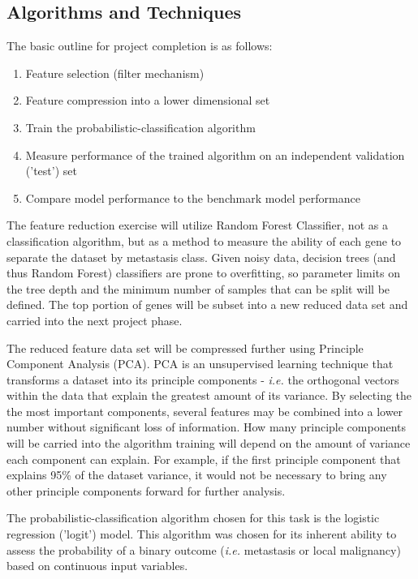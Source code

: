 \documentclass[final]{article}
\begin{document}
\subsection{Algorithms and Techniques}

The basic outline for project completion is as follows:
\begin{enumerate}
\item Feature selection (filter mechanism)
\item Feature compression into a lower dimensional set
\item Train the probabilistic-classification algorithm
\item Measure performance of the trained algorithm on an independent validation ('test') set
\item Compare model performance to the benchmark model performance
\end{enumerate}

The feature reduction exercise will utilize Random Forest Classifier, not as a
classification algorithm, but as a method to measure the ability of each gene to
separate the dataset by metastasis class.  Given noisy data, decision trees (and
thus Random Forest) classifiers are prone to overfitting, so parameter limits on
the tree depth and the minimum number of samples that can be split will be defined.
The top portion of genes will be subset into a new reduced data set and carried
into the next project phase.

The reduced feature data set will be compressed further using Principle Component
Analysis (PCA).  PCA is an unsupervised learning technique that transforms a
dataset into its principle components - \textit{i.e.} the orthogonal vectors within the
data that explain the greatest amount of its variance.  By selecting the
the most important components, several features may be combined into a lower
number without significant loss of information.  How many principle components
will be carried into the algorithm training will depend on the amount of variance
each component can explain.  For example, if the first principle component that
explains 95\% of the dataset variance, it would not be necessary to bring any other
principle components forward for further analysis.

The probabilistic-classification algorithm chosen for this task is the logistic
regression ('logit') model.  This algorithm was chosen for its inherent ability
to assess the probability of a binary outcome (\textit{i.e.} metastasis or local
malignancy) based on continuous input variables.
\end{document}
